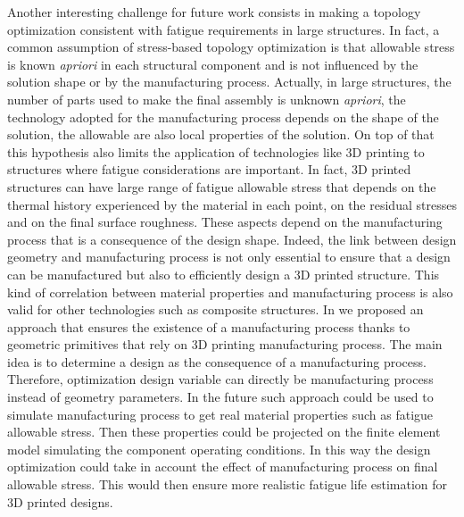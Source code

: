 Another interesting challenge for future work consists in making a topology optimization consistent with fatigue requirements in large structures. In fact, a common assumption of stress-based topology optimization is that allowable stress is known \textit{apriori} in each structural component and is not influenced by the solution shape or by the manufacturing process. Actually, in large structures, the number of parts used to make the final assembly is unknown \textit{apriori}, the technology adopted for the manufacturing process depends on the shape of the solution, the allowable are also local properties of the solution. On top of that this hypothesis also limits the application of technologies like 3D printing to structures where fatigue considerations are important. In fact, 3D printed structures can have large range of fatigue allowable stress that depends on the thermal history experienced by the material in each point, on the residual stresses and on the final surface roughness. These aspects depend on the manufacturing process that is a consequence of the design shape. Indeed, the link between design geometry and manufacturing process is not only essential to ensure that a design can be manufactured but also to efficiently design a 3D printed structure. This kind of correlation between material properties and manufacturing process is also valid for other technologies such as composite structures. In \cite{vilas2019Une} we proposed an approach that ensures the existence of a manufacturing process thanks to geometric primitives that rely on 3D printing manufacturing process. The main idea is to determine a design as the consequence of a manufacturing process. Therefore, optimization design variable can directly be manufacturing process instead of geometry parameters. In the future such approach could be used to simulate manufacturing process to get real material properties such as fatigue allowable stress. Then these properties could be projected on the finite element model simulating the component operating conditions. In this way the design optimization could take in account the effect of manufacturing process on final allowable stress. This would then ensure more realistic fatigue life estimation for 3D printed designs.


